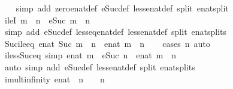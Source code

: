 \begin{isabellebody}
%
\isadelimproof
\ \ %
\endisadelimproof
%
\isatagproof
{}\isamarkupfalse%
\ {\isacharparenleft}simp\ add{\isacharcolon}\ zero{\isacharunderscore}enat{\isacharunderscore}def\ eSuc{\isacharunderscore}def\ less{\isacharunderscore}enat{\isacharunderscore}def\ split{\isacharcolon}\ enat{\isachardot}split{\isacharparenright}%
\endisatagproof
{\isafoldproof}%
%
\isadelimproof
\isanewline
%
\endisadelimproof
\isanewline
{}\isamarkupfalse%
\ ileI{}{\isacharcolon}\ {\isachardoublequoteopen}m\ {\isacharless}\ n\ {\isasymLongrightarrow}\ eSuc\ m\ {\isasymle}\ n{\isachardoublequoteclose}\isanewline
%
\isadelimproof
\ \ %
\endisadelimproof
%
\isatagproof
{}\isamarkupfalse%
\ {\isacharparenleft}simp\ add{\isacharcolon}\ eSuc{\isacharunderscore}def\ less{\isacharunderscore}eq{\isacharunderscore}enat{\isacharunderscore}def\ less{\isacharunderscore}enat{\isacharunderscore}def\ split{\isacharcolon}\ enat{\isachardot}splits{\isacharparenright}%
\endisatagproof
{\isafoldproof}%
%
\isadelimproof
\isanewline
%
\endisadelimproof
\isanewline
{}\isamarkupfalse%
\ Suc{\isacharunderscore}ile{\isacharunderscore}eq{\isacharcolon}\ {\isachardoublequoteopen}enat\ {\isacharparenleft}Suc\ m{\isacharparenright}\ {\isasymle}\ n\ {\isasymlongleftrightarrow}\ enat\ m\ {\isacharless}\ n{\isachardoublequoteclose}\isanewline
%
\isadelimproof
\ \ %
\endisadelimproof
%
\isatagproof
{}\isamarkupfalse%
\ {\isacharparenleft}cases\ n{\isacharparenright}\ auto%
\endisatagproof
{\isafoldproof}%
%
\isadelimproof
\isanewline
%
\endisadelimproof
\isanewline
{}\isamarkupfalse%
\ iless{\isacharunderscore}Suc{\isacharunderscore}eq\ {\isacharbrackleft}simp{\isacharbrackright}{\isacharcolon}\ {\isachardoublequoteopen}enat\ m\ {\isacharless}\ eSuc\ n\ {\isasymlongleftrightarrow}\ enat\ m\ {\isasymle}\ n{\isachardoublequoteclose}\isanewline
%
\isadelimproof
\ \ %
\endisadelimproof
%
\isatagproof
{}\isamarkupfalse%
\ {\isacharparenleft}auto\ simp\ add{\isacharcolon}\ eSuc{\isacharunderscore}def\ less{\isacharunderscore}enat{\isacharunderscore}def\ split{\isacharcolon}\ enat{\isachardot}splits{\isacharparenright}%
\endisatagproof
{\isafoldproof}%
%
\isadelimproof
\isanewline
%
\endisadelimproof
\isanewline
{}\isamarkupfalse%
\ imult{\isacharunderscore}infinity{\isacharcolon}\ {\isachardoublequoteopen}{\isacharparenleft}{}{\isacharcolon}{\isacharcolon}enat{\isacharparenright}\ {\isacharless}\ n\ {\isasymLongrightarrow}\ {\isasyminfinity}\ {\isacharasterisk}\ n\ {\isacharequal}\ {\isasyminfinity}{\isachardoublequoteclose}\isanewline

\end{isabellebody}
